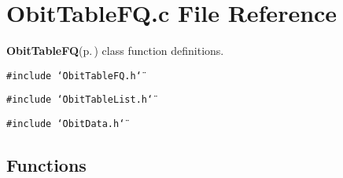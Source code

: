 \section{Obit\-Table\-FQ.c File Reference}
\label{ObitTableFQ_8c}
{\bf Obit\-Table\-FQ}{\rm (p.\,\pageref{structObitTableFQ})} class function definitions. 

{\tt \#include \char`\"{}Obit\-Table\-FQ.h\char`\"{}}\par
{\tt \#include \char`\"{}Obit\-Table\-List.h\char`\"{}}\par
{\tt \#include \char`\"{}Obit\-Data.h\char`\"{}}\par
\subsection*{Functions}
